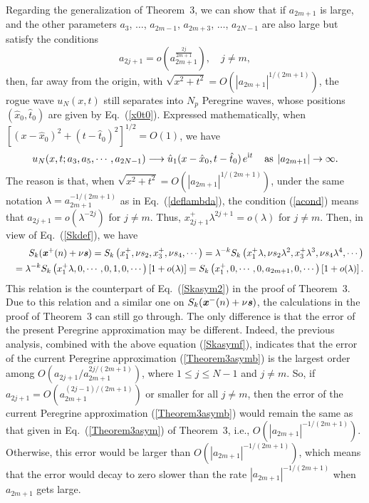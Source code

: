 \documentclass[amsmath,amssymb]{revtex4}
\def\[{\begin{equation}}
\def\]{\end{equation}}
\begin{document}
Regarding the generalization of Theorem~3, we can show that if $a_{2m+1}$ is large, and the other parameters $a_3$, $\dots$, $a_{2m-1}$, $a_{2m+3}$, $\dots$, $a_{2N-1}$ are also large but satisfy the conditions
\[ \label{acond}
a_{2j+1}=o\left( a_{2m+1}^{\frac{2j}{2m+1}} \right),\quad j\neq m,
\]
then, far away from the origin, with $\sqrt{x^2+t^2}=O\left(|a_{2m+1}|^{1/(2m+1)}\right)$, the rogue wave $u_N(x,t)$ still separates into $N_p$ Peregrine waves, whose positions $(\hat{x}_{0}, \hat{t}_{0})$ are given by Eq.~(\ref{x0t0}). Expressed mathematically, when $\left[(x-\hat{x}_{0})^2+(t-\hat{t}_{0})^2\right]^{1/2}=O(1)$, we have
\[ \label{Theorem3asymb}
u_{N}(x,t; a_{3}, a_{5}, \cdots, a_{2N-1}) \longrightarrow \hat{u}_1(x-\hat{x}_{0},t-\hat{t}_{0})\hspace{0.05cm} e^{\textrm{i}t} \hspace{0.4cm} \mbox{as} \hspace{0.15cm} |a_{2m+1}| \to  \infty.
\]
The reason is that, when $\sqrt{x^2+t^2}=O\left(|a_{2m+1}|^{1/(2m+1)}\right)$, under the same notation $\lambda=a_{2m+1}^{-1/(2m+1)}$ as in Eq.~(\ref{deflambda}), the condition (\ref{acond}) means that $a_{2j+1}=o(\lambda^{-2j})$ for $j\ne m$. Thus, $x_{2j+1}^+\lambda^{2j+1}=o(\lambda)$ for $j\ne m$. Then, in view of Eq.~(\ref{Skdef}), we have
\begin{eqnarray} \label{Skasymf}
&& S_{k}(\textbf{\emph{x}}^{+}(n) +\nu \textbf{\emph{s}}) =
S_{k}\left(x_{1}^{+}, \nu s_{2}, x_{3}^{+}, \nu s_4, \cdots\right)=\lambda^{-k} S_{k}\left(x_{1}^{+}\lambda, \nu s_{2}\lambda^2, x_{3}^{+}\lambda^3, \nu s_{4}\lambda^4, \cdots\right) \nonumber \\
&&= \lambda^{-k} S_{k}\left(x_{1}^{+}\lambda, 0, \cdots, 0, 1, 0, \cdots\right) \left[1+o(\lambda)\right]
=S_{k}\left(x_{1}^{+}, 0, \cdots, 0, a_{2m+1}, 0, \cdots\right)\left[1+o(\lambda)\right].
\end{eqnarray}
This relation is the counterpart of Eq.~(\ref{Skasym2}) in the proof of Theorem~3. Due to this relation and a similar one on $S_{k}(\textbf{\emph{x}}^{-}(n) +\nu \textbf{\emph{s}})$, the calculations in the proof of Theorem~3 can still go through. The only difference is that the error of the present Peregrine approximation may be different. Indeed, the previous analysis, combined with the above equation (\ref{Skasymf}), indicates that the error of the current Peregrine approximation (\ref{Theorem3asymb}) is the largest order among
$O\left(a_{2j+1}/a_{2m+1}^{2j/(2m+1)}\right)$, where $1\le j\le N-1$ and $j\ne m$. So, if $a_{2j+1}=O\left( a_{2m+1}^{(2j-1)/(2m+1)} \right)$ or smaller for all $j\ne m$, then the error of the current Peregrine approximation (\ref{Theorem3asymb}) would remain the same as that given in Eq.~(\ref{Theorem3asym}) of Theorem~3, i.e., $O\left(|a_{2m+1}|^{-1/(2m+1)}\right)$. Otherwise, this error would be larger than $O\left(|a_{2m+1}|^{-1/(2m+1)}\right)$, which means that the error would decay to zero slower than the rate $|a_{2m+1}|^{-1/(2m+1)}$ when $a_{2m+1}$ gets large.
\end{document}
